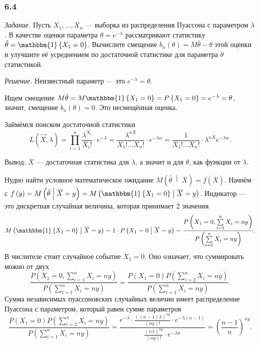 \subsubsection*{6.4}

\textit{Задание.}
Пусть $X_1, \dotsc, X_n$ --- выборка из распределения Пуассона с параметром $ \lambda $.
В качестве оценки параметра $ \theta = e^{- \lambda }$ рассматривают статистику
$ \hat{ \theta } =
  \mathbbm{1} \left\{ X_1 = 0 \right\} $.
Вычислите смещение $b_n \left( \theta \right) = M \hat{ \theta } - \theta $
этой оценки и улучшите её усреднением по достаточной статистике для параметра
$ \theta $ статистикой.

\textit{Решение.} Неизвестный параметр --- это $e^{- \lambda } = \theta $.

Ищем смещение
$M \hat{ \theta } =
  M \mathbbm{1} \left\{ X_1 = 0 \right\} =
  P \left\{ X_1 = 0 \right\} =
  e^{- \lambda } =
  \theta $,
значит, смещение $b_n \left( \theta \right) = 0$.
Это несмещённая оценка.

Займёмся поиском достаточной статистики
$$L \left( \vec{X}, \lambda \right) =
  \prod \limits_{i = 1}^n \frac{ \lambda^{X_i}}{X_i!} \cdot e^{- \lambda } =
  \frac{ \lambda^{n \overline{X}}}{X_1! \dotsc X_n!} \cdot e^{- \lambda n} =
  \frac{1}{X_1! \dotsc X_n!} \cdot \lambda^{n \overline{X}} e^{- \lambda n}.$$

Вывод: $ \overline{X}$ --- достаточная статистика для $ \lambda $, а значит и для $ \theta $,
как функции от $ \lambda $.

Нудно найти условное математическое ожидание
$M \left( \hat{ \theta } \; \middle| \; \overline{X} \right) =
  f \left( \overline{X} \right) $.
Начнём с
$f \left( y \right) =
  M \left( \hat{ \theta } \; \middle| \; \overline{X} = y \right) =
  M \left( \mathbbm{1} \left\{ X_1 = 0 \right\} \; \middle| \; \overline{X} = y \right) $.
Индикатор --- это дискретная случайная величина, которая принимает 2 значения
$$M \left( \mathbbm{1} \left\{ X_1 = 0 \right\} \; \middle| \; \overline{X} = y \right) =
  1 \cdot P \left( X_1 = 0 \; \middle| \; \overline{X} = y \right) =
  \frac{P \left( X_1 = 0, \sum \limits_{i = 1}^n X_i = ny \right) }{P \left( \sum \limits_{i = 1}^n X_i = ny \right) }.$$
В числителе стоит случайное событие $X_1 = 0$.
Оно означает, что суммировать можно от двух
$$ \frac{P \left( X_1 = 0, \sum \limits_{i = 1}^n X_i = ny \right) }{P \left( \sum \limits_{i = 1}^n X_i = ny \right) } =
  \frac{P \left( X_1 = 0 \right) P \left( \sum \limits_{i = 2}^n X_i = ny \right) }{P \left( \sum \limits_{i = 1}^n X_i = ny \right) }.$$
Сумма независимых пуассоновских случайных величин имеет распределение Пуассона с параметром,
который равен сумме параметров
$$ \frac{P \left( X_1 = 0 \right) P \left( \sum \limits_{i = 2}^n X_i = ny \right) }{P \left( \sum \limits_{i = 1}^n X_i = ny \right) } =
  \frac{e^{- \lambda } \cdot \frac{ \left( \left( n - 1 \right) \lambda \right)^{ny}}{ \left( ny \right)!} \cdot e^{- \lambda \left( n - 1 \right) }}{ \frac{ \left( n \lambda \right)^{ny}}{ \left( ny \right)!} \cdot e^{- \lambda n}} =
  \left( \frac{n - 1}{n} \right)^{ny}.$$

